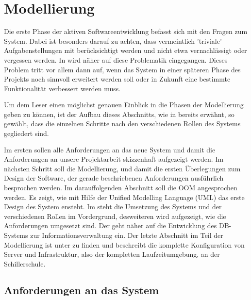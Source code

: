 \section{Modellierung}\label{sec:Modellierung}

Die erste Phase der aktiven Softwareentwicklung befasst sich mit den Fragen zum System. Dabei ist besonders darauf zu achten, dass vermeintlich 'triviale' Aufgabenstellungen mit berücksichtigt werden und nicht etwa vernachlässigt oder vergessen werden.  In  wird näher auf diese Problematik eingegangen. Dieses Problem tritt vor allem dann auf, wenn das System in einer späteren Phase des Projekts noch sinnvoll erweitert werden soll oder in Zukunft eine bestimmte Funktionalität verbessert werden muss.

Um dem Leser einen möglichst genauen Einblick in die Phasen der Modellierung geben zu können, ist der Aufbau dieses Abschnitts, wie in  bereits erwähnt, so gewählt, dass die einzelnen Schritte nach den verschiedenen Rollen des Systems gegliedert sind.

Im ersten  sollen alle Anforderungen an das neue System und damit die Anforderungen an unsere Projektarbeit skizzenhaft aufgezeigt werden.
Im nächsten Schritt soll die Modellierung, und damit die ersten Überlegungen zum Design der Software, der gerade beschriebenen Anforderungen ausführlich besprochen werden.
Im darauffolgenden Abschnitt soll die \ac{OOM} angesprochen werden. Es zeigt, wie mit Hilfe der \gls{Unified Modelling Language} (UML) das erste Design des System ensteht.  
Im  steht die Umsetzung des Systems und der verschiedenen Rollen im Vordergrund, desweiteren wird aufgezeigt, wie die Anforderungen umgesetzt sind.
Der  geht näher auf die Entwicklung des \ac{DB}-Systems zur Informationsverwaltung ein.
Der letzte Abschnitt im Teil der Modellierung ist unter  zu finden und beschreibt die komplette Konfiguration von Server und Infrastruktur, also der kompletten Laufzeitumgebung, an der Schillerschule. 

\subsection{Anforderungen an das System}\label{subsec:Anforderungen an das System}


